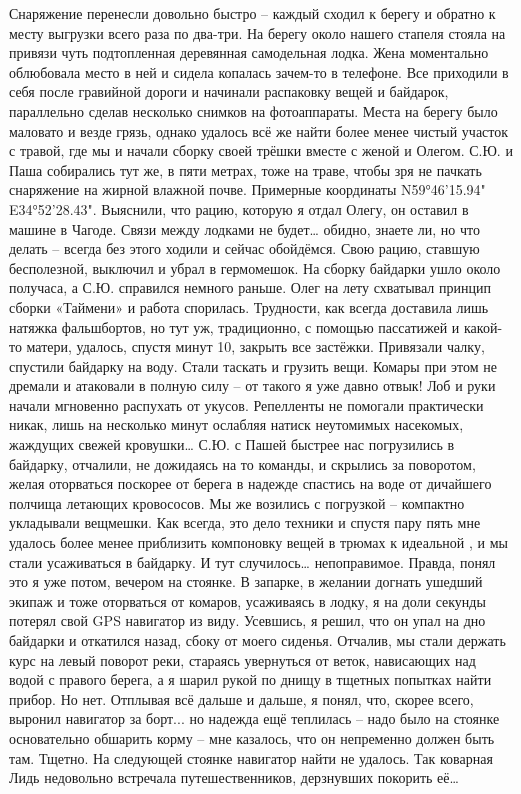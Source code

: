 Снаряжение перенесли довольно быстро – каждый сходил к берегу и обратно к месту выгрузки всего раза по два-три. На берегу около нашего стапеля стояла на привязи чуть подтопленная деревянная самодельная лодка. Жена моментально облюбовала место в ней и сидела копалась зачем-то в телефоне. Все приходили в себя после гравийной дороги и начинали распаковку вещей и байдарок, параллельно сделав несколько снимков на фотоаппараты. 
Места на берегу было маловато и везде грязь, однако удалось всё же найти более менее чистый участок с травой, где мы и начали сборку своей трёшки вместе с женой и Олегом. С.Ю. и Паша собирались тут же, в пяти метрах, тоже на траве, чтобы зря не пачкать снаряжение на жирной влажной почве. Примерные координаты N59°46'15.94" E34°52'28.43".
Выяснили, что рацию, которую я отдал Олегу, он оставил в машине в Чагоде. Связи между лодками не будет… обидно, знаете ли, но что делать – всегда без этого ходили и сейчас обойдёмся. Свою рацию, ставшую бесполезной, выключил и убрал в гермомешок.
На сборку байдарки ушло около получаса, а С.Ю. справился немного раньше. Олег на лету схватывал принцип сборки «Таймени» и работа спорилась. Трудности, как всегда доставила лишь натяжка фальшбортов, но тут уж, традиционно, с помощью пассатижей и какой-то матери, удалось, спустя минут 10, закрыть все застёжки. Привязали чалку, спустили байдарку на воду. Стали таскать и грузить вещи. Комары при этом не дремали и атаковали в полную силу – от такого я уже давно отвык! Лоб и руки начали мгновенно распухать от укусов. Репелленты не помогали практически никак, лишь на несколько минут ослабляя натиск неутомимых насекомых, жаждущих свежей кровушки… С.Ю. с Пашей быстрее нас погрузились в байдарку, отчалили, не дожидаясь на то команды, и скрылись за поворотом, желая оторваться поскорее от берега в надежде спастись на воде от дичайшего полчища летающих кровососов.
Мы же возились с погрузкой – компактно укладывали вещмешки. Как всегда, это дело техники и спустя пару пять мне удалось более менее приблизить компоновку вещей в трюмах к идеальной	, и мы стали усаживаться в байдарку. 
И тут случилось… непоправимое. Правда, понял это я уже потом, вечером на стоянке. В запарке, в желании догнать ушедший экипаж и тоже оторваться от комаров, усаживаясь в лодку, я на доли секунды потерял свой GPS навигатор из виду. Усевшись, я решил, что он упал на дно байдарки и откатился назад, сбоку от моего сиденья. Отчалив, мы стали держать курс на левый поворот реки, стараясь увернуться от веток, нависающих над водой с правого берега, а я шарил рукой по днищу в тщетных попытках найти прибор. Но нет. Отплывая всё дальше и дальше, я понял, что, скорее всего, выронил навигатор за борт... но надежда ещё теплилась – надо было на стоянке основательно обшарить корму – мне казалось, что он непременно должен быть там. Тщетно. На следующей стоянке навигатор найти не удалось. Так коварная Лидь недовольно встречала путешественников, дерзнувших покорить её…
